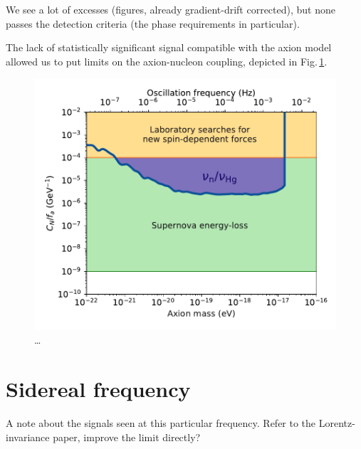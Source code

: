 We see a lot of excesses (figures, already gradient-drift corrected), but none passes the detection criteria (the phase requirements in particular).

The lack of statistically significant signal compatible with the axion model allowed us to put limits on the axion-nucleon coupling, depicted in Fig.\,\ref{fig:axions_wind_limits}. 

\begin{figure}
  \centering
  \includegraphics[width=0.9\linewidth]{gfx/axions/psi_ill_axion_wind_limits_v1.pdf}
  \caption{\ldots}
  \label{fig:axions_wind_limits}
\end{figure}



\section{Sidereal frequency}
A note about the signals seen at this particular frequency. Refer to the Lorentz-invariance paper, improve the limit directly? \cite{ALTAREV20112365}



